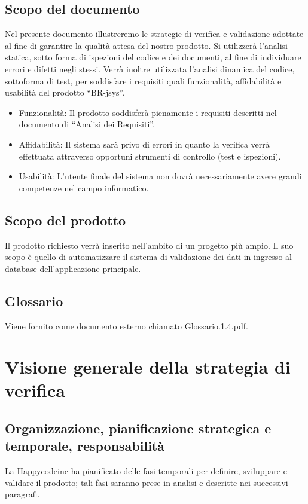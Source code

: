 \documentclass[11pt,titlepage,a4paper]{report}
\begin{document}
\section{Scopo del documento}
Nel presente documento illustreremo le strategie di verifica e validazione adottate al fine di garantire la qualit\`a attesa del nostro prodotto. Si utilizzer\`a l'analisi statica, sotto forma di ispezioni del codice e dei documenti, al fine di individuare errori e difetti negli stessi. Verr\`a inoltre utilizzata l'analisi dinamica del codice, sottoforma di test, per soddisfare i requisiti quali funzionalit\`a, affidabilit\`a e usabilit\`a del prodotto ``BR-jsys''.
\begin{itemize}
\item Funzionalit\`a: \newline
Il prodotto soddisfer\`a pienamente i requisiti descritti nel documento di ``Analisi dei Requisiti''.
\item Affidabilit\`a: \newline
Il sistema sar\`a privo di errori in quanto la verifica verr\`a effettuata attraverso opportuni strumenti di controllo (test e ispezioni).
\item Usabilit\`a:
L'utente finale del sistema non dovr\`a necessariamente avere grandi competenze nel campo informatico.
\end{itemize}

\section{Scopo del prodotto}
Il prodotto richiesto verr\`a inserito nell'ambito di un progetto pi\`u ampio. Il suo scopo \`e quello di automatizzare il sistema di validazione dei dati in ingresso al database dell'applicazione principale.

\section{Glossario}
Viene fornito come documento esterno chiamato Glossario.1.4.pdf.

\chapter[Strategia di verifica]{Visione generale della strategia di verifica}
\section[Organizzazione, pianificazione, responsabilit\`a]{Organizzazione, pianificazione strategica e temporale, responsabilit\`a}
La Happycodeinc ha  pianificato delle fasi temporali per definire, sviluppare e validare il prodotto; tali fasi saranno prese in analisi e descritte nei successivi paragrafi.
\end{document}
